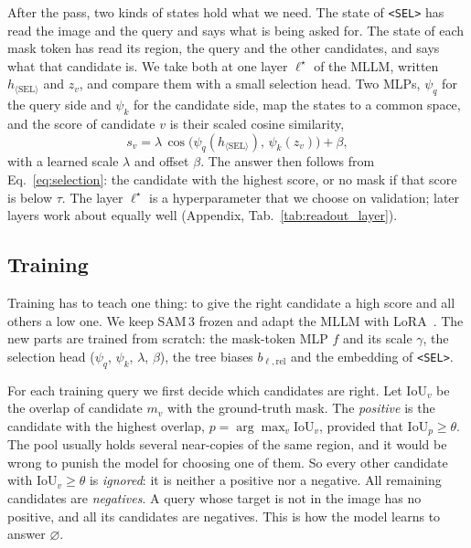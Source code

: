 After the pass, two kinds of states hold what we need. The state of \texttt{<SEL>} has read the image and the query
and says what is being asked for. The state of each mask token has read its region, the query and the other
candidates, and says what that candidate is. We take both at one layer $\ell^{\star}$ of the MLLM, written
$h_{\langle\mathrm{SEL}\rangle}$ and $z_v$, and compare them with a small selection head. Two MLPs, $\psi_q$ for the
query side and $\psi_k$ for the candidate side, map the states to a common space, and the score of candidate $v$ is
their scaled cosine similarity,
\begin{equation}
  s_v=\lambda\,\cos\!\big(\psi_q(h_{\langle\mathrm{SEL}\rangle}),\,\psi_k(z_v)\big)+\beta ,
  \label{eq:score}
\end{equation}
with a learned scale $\lambda$ and offset $\beta$. The answer then follows from Eq.~\eqref{eq:selection}: the
candidate with the highest score, or no mask if that score is below $\tau$. The layer $\ell^{\star}$ is a
hyperparameter that we choose on validation; later layers work about equally well (Appendix,
Tab.~\ref{tab:readout_layer}).

\subsection{Training}
\label{sec:training}

Training has to teach one thing: to give the right candidate a high score and all others a low one. We keep SAM\,3
frozen and adapt the MLLM with LoRA~\cite{lora}. The new parts are trained from scratch: the mask-token MLP $f$ and
its scale $\gamma$, the selection head ($\psi_q$, $\psi_k$, $\lambda$, $\beta$), the tree biases
$b_{\ell,\mathrm{rel}}$ and the embedding of \texttt{<SEL>}.

For each training query we first decide which candidates are right. Let $\mathrm{IoU}_v$ be the overlap of
candidate $m_v$ with the ground-truth mask. The \emph{positive} is the candidate with the highest overlap,
$p=\arg\max_v \mathrm{IoU}_v$, provided that $\mathrm{IoU}_p\ge\theta$. The pool usually holds several near-copies
of the same region, and it would be wrong to punish the model for choosing one of them. So every other candidate
with $\mathrm{IoU}_v\ge\theta$ is \emph{ignored}: it is neither a positive nor a negative. All remaining candidates
are \emph{negatives}. A query whose target is not in the image has no positive, and all its candidates are
negatives. This is how the model learns to answer $\varnothing$.

